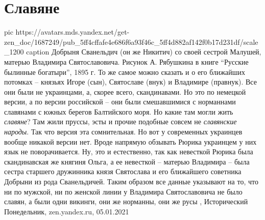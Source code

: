  
 
 
 
 
\chapter{Славяне}

\ifcmt
  pic https://avatars.mds.yandex.net/get-zen_doc/1687249/pub_5ff4cffafe4e686f6a93f46c_5ff4d882af142f0b17d231df/scale_1200
	caption Добрыня Сванельдич (он же Никитич) со своей сестрой Малушей, матерью Владимира Святославовича. Рисунок А. Рябушкина в книге \enquote{Русские былинные богатыри}, 1895 г.
\fi
То же самое можно сказать и о его ближайших потомках – князьях Игоре (сын),
Святославе (внук) и Владимире (правнук). Все они были не украинцами, а, скорее
всего, скандинавами. Но это по немецкой версии, а по версии российской – они
были смешавшимися с норманнами славянами с южных берегов Балтийского моря. Но
какие там могли жить \emph{славяне}? Там жили пруссы, эсты и прочие подобные
совсем не \emph{славянские народы}. Так что версия эта сомнительная.  Но вот у
современных украинцев вообще никакой версии нет. Вроде напрямую обзывать Рюрика
украинцем у них язык не поворачивается. Ну, это и естественно, так как
невесткой Рюрика была скандинавская же княгиня Ольга, а ее невесткой – матерью
Владимира – была сестра старшего дружинника князя Святослава и его ближайшего
советника Добрыни из рода Сванельдичей. Таким образом все данные указывают на
то, что ни по мужской, ни по женской линии у Владимира Святославовича не было
славян, а были одни викинги, они же норманны, они же русы
,
Исторический Понедельник, zen.yandex.ru, 05.01.2021 

